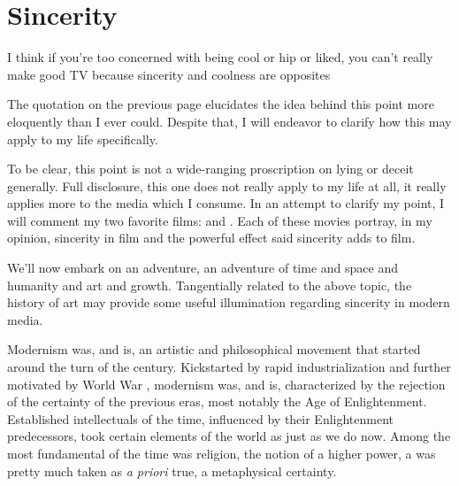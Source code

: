 \documentclass[../butidigress.tex]{subfiles}
\newcounter{worldwarcounter}\setcounter{worldwarcounter}{1}
\begin{document}
\chapter{Sincerity}\label{chap:sincerity}
\epigraph{I think if you're too concerned with being cool or hip or liked, you can't really make good TV because sincerity and coolness are opposites}{}
\newpage

The quotation on the previous page elucidates the idea behind this point more eloquently than I ever could.
Despite that, I will endeavor to clarify how this may apply to my life specifically.

To be clear, this point is not a wide-ranging proscription on lying or deceit generally.
Full disclosure, this one does not really apply to my life at all, it really applies more to the media which I consume.
In an attempt to clarify my point, I will comment my two favorite films:  and .
Each of these movies portray, in my opinion, sincerity in film and the powerful effect said sincerity adds to film.

\vspace{1em}

We'll now embark on an adventure, an adventure of time and space and humanity and art and growth.
Tangentially related to the above topic, the history of art may provide some useful illumination regarding sincerity in modern media.

Modernism was, and is, an artistic and philosophical movement that started around the turn of the  century.
Kickstarted by rapid industrialization and further motivated by World War , modernism was, and is, characterized by the rejection of the certainty of the previous eras, most notably the Age of Enlightenment.
Established intellectuals of the time, influenced by their Enlightenment predecessors, took certain elements of the world as  just as we do now.
Among the most fundamental of the time was religion, the notion of a higher power, a  was pretty much taken as \textit{a priori} true, a metaphysical certainty.
\end{document}
